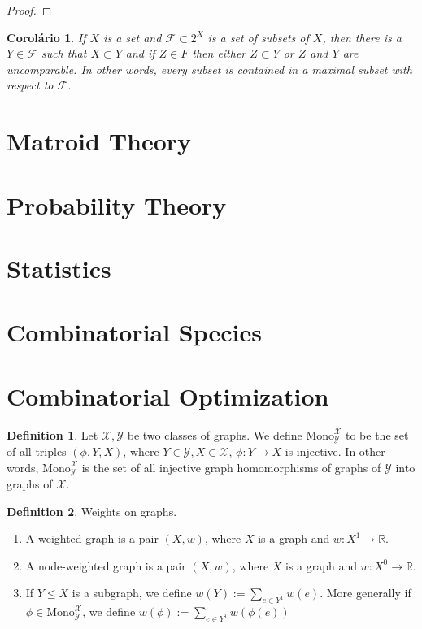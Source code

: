 \documentclass[]{article}
\newtheorem{coro}{Corolário}[section]
\theoremstyle{definition}
\newtheorem{definition}{Definition}[section]
\theoremstyle{definition}
\newcommand{\raw}{\rightarrow}
\newcommand{\bb}{\mathbb}
\newcommand{\cax}{\mathcal{X}}
\newcommand{\cay}{\mathcal{Y}}
\newcommand{\monoxy}{\text{Mono}_\mathcal{Y}^\mathcal{X}}
\begin{document}
\begin{proof}
	
	
\end{proof}

\begin{coro}
	If $X$ is a set and $\mathcal{F} \subset 2^X$ is a set of subsets of $X$, then there is a $Y \in \mathcal{F}$ such that $X \subset Y$ and if $Z \in F$ then either $Z \subset Y$ or $Z$ and $Y$ are uncomparable. In other words, every subset is contained in a maximal subset with respect to $\mathcal{F}$.
\end{coro}

\section{Matroid Theory}
\section{Probability Theory}
\section{Statistics}

\section{Combinatorial Species}

\newpage
\section{Combinatorial Optimization}

\begin{definition}
	Let $\cax, \cay$ be two classes of graphs. We define $\monoxy$ to be the set of all triples $(\phi, Y, X)$, where $Y \in \cay, X \in \cax$, $\phi: Y \raw X$ is injective. In other words, $\monoxy$ is the set of all injective graph homomorphisms of graphs of $\cay$ into graphs of $\cax$. 
\end{definition}

\begin{definition}
	Weights on graphs.
	
	\begin{enumerate}
		\item A weighted graph is a pair $(X, w)$, where $X$ is a graph and $w: X^1 \raw \bb{R}$.
		
		\item A node-weighted graph is a pair $(X, w)$, where $X$ is a graph and $w: X^0 \raw \bb{R}$.
		
		\item If $Y \leq X$ is a subgraph, we define $w(Y) := \sum_{e \in Y^1} w(e)$. More generally if $\phi \in \monoxy$, we define $w(\phi) := \sum_{e \in Y^1} w(\phi(e))$
	\end{enumerate}
	
\end{definition}
\end{document}
